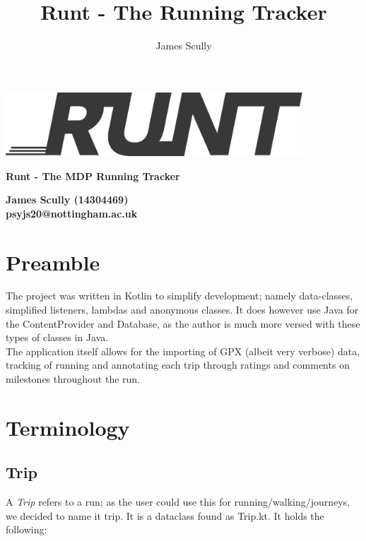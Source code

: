 \documentclass[11pt]{article}
\title{\textbf{Runt - The Running Tracker}}
\author{James Scully}
\begin{document}
\hspace{0pt}

\vfill

\begin{center}
	\includegraphics[width=30em]{runtlogo_dark}
	
	\vspace{1cm}	
	{\Large \textbf{Runt - The MDP Running Tracker}} \linebreak
	
	\begin{large}
		\textbf{James Scully (14304469) \\
		psyjs20@nottingham.ac.uk \\}
	\end{large}
	
\end{center}

\vfill

\pagebreak

\tableofcontents

\newpage

\section{Preamble}
The project was written in Kotlin to simplify development; namely data-classes, simplified listeners, lambdas and anonymous classes. It does however use Java for the ContentProvider and Database, as the author is much more versed with these types of classes in Java. \\

The application itself allows for the importing of GPX (albeit very verbose) data, tracking of running and annotating each trip through ratings and comments on milestones throughout the run.

\section{Terminology}
\subsection{Trip} 
A \textit{Trip} refers to a run; as the user could use this for running/walking/journeys, we decided to name it trip. It is a dataclass found as Trip.kt. It holds the following: \\
\end{document}
